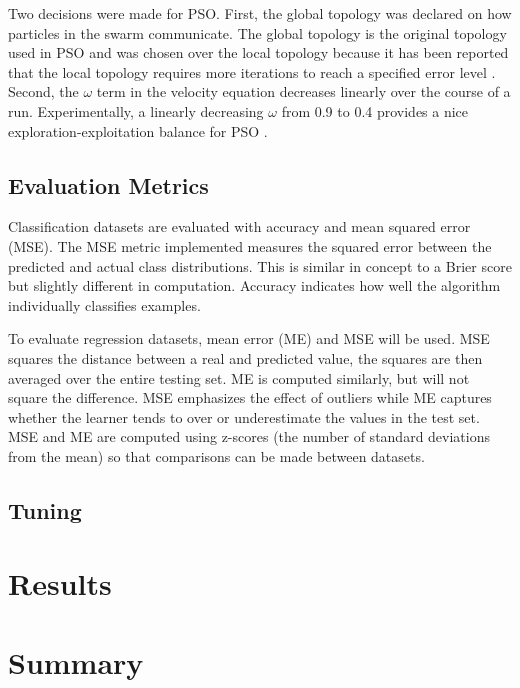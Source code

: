 \documentclass[twoside,11pt]{article}
\begin{document}
	
	Two decisions were made for PSO. First, the global topology was declared on how particles in the swarm communicate. 
	The global topology is the original topology used in PSO and was chosen over the local topology because it has been reported that the local topology requires more iterations to reach a specified error level \citep{og-pso}. 
	Second, the $\omega$ term in the velocity equation decreases linearly over the course of a run. Experimentally, a linearly decreasing $\omega$ from 0.9 to 0.4 provides a nice exploration-exploitation balance for PSO \citep{inertia}.
	

\subsection{Evaluation Metrics}

	Classification datasets are evaluated with accuracy and mean squared error (MSE). 
	The MSE metric implemented measures the squared error between the predicted and actual class distributions. 
	This is similar in concept to a Brier score but slightly different in computation. Accuracy indicates how well the algorithm individually classifies examples.
	
	To evaluate regression datasets, mean error (ME) and MSE will be used. MSE squares the distance between a real and predicted value, the squares are then averaged over the entire testing set. 
	ME is computed similarly, but will not square the difference. MSE emphasizes the effect of outliers while ME captures whether the learner tends to over or underestimate the values in the test set. 
	MSE and ME are computed using z-scores (the number of standard deviations from the mean) so that comparisons can be made between datasets.

\subsection{Tuning}

\section{Results}

\section{Summary}

\newpage


\end{document}

